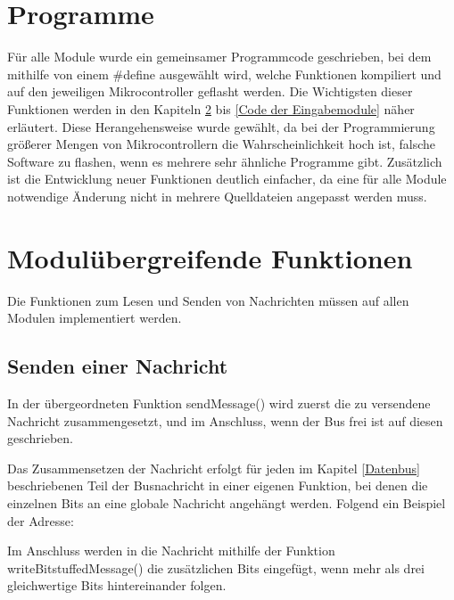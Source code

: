 \section{Programme}
Für alle Module wurde ein gemeinsamer Programmcode geschrieben, bei dem mithilfe von einem \#define ausgewählt wird, welche Funktionen kompiliert und auf den jeweiligen Mikrocontroller geflasht werden. Die Wichtigsten dieser Funktionen werden in den Kapiteln \ref{Modulübergreifende Funktionen} bis \ref{Code der Eingabemodule} näher erläutert. Diese Herangehensweise wurde gewählt, da bei der Programmierung größerer Mengen von Mikrocontrollern die Wahrscheinlichkeit hoch ist, falsche Software zu flashen, wenn es mehrere sehr ähnliche Programme gibt. Zusätzlich ist die Entwicklung neuer Funktionen deutlich einfacher, da eine für alle Module notwendige Änderung nicht in mehrere Quelldateien angepasst werden muss.

\section{Modulübergreifende Funktionen}
\label{Modulübergreifende Funktionen}
Die Funktionen zum Lesen und Senden von Nachrichten müssen auf allen Modulen implementiert werden.

\subsection{Senden einer Nachricht}
In der übergeordneten Funktion sendMessage() wird zuerst die zu versendene Nachricht zusammengesetzt, und im Anschluss, wenn der Bus frei ist auf diesen geschrieben.



Das Zusammensetzen der Nachricht erfolgt für jeden im Kapitel \ref{Datenbus} beschriebenen Teil der Busnachricht in einer eigenen Funktion, bei denen die einzelnen Bits an eine globale Nachricht angehängt werden. Folgend ein Beispiel der Adresse:



Im Anschluss werden in die Nachricht mithilfe der Funktion writeBitstuffedMessage() die zusätzlichen Bits eingefügt, wenn mehr als drei gleichwertige Bits hintereinander folgen. 

